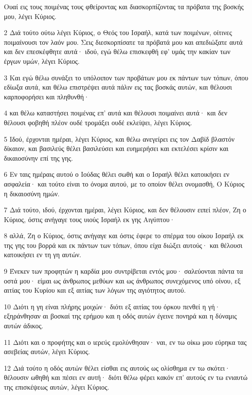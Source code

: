 \par Ουαί εις τους ποιμένας τους φθείροντας και διασκορπίζοντας τα πρόβατα της βοσκής μου, λέγει Κύριος.
\par 2 Διά τούτο ούτω λέγει Κύριος, ο Θεός του Ισραήλ, κατά των ποιμένων, οίτινες ποιμαίνουσι τον λαόν μου. Σεις διεσκορπίσατε τα πρόβατά μου και απεδιώξατε αυτά και δεν επεσκέφθητε αυτά· ιδού, εγώ θέλω επισκεφθή εφ' υμάς την κακίαν των έργων υμών, λέγει Κύριος.
\par 3 Και εγώ θέλω συνάξει το υπόλοιπον των προβάτων μου εκ πάντων των τόπων, όπου εδίωξα αυτά, και θέλω επιστρέψει αυτά πάλιν εις τας βοσκάς αυτών, και θέλουσι καρποφορήσει και πληθυνθή·
\par 4 και θέλω καταστήσει ποιμένας επ' αυτά και θέλουσι ποιμαίνει αυτά· και δεν θέλουσι φοβηθή πλέον ουδέ τρομάξει ουδέ εκλείψει, λέγει Κύριος.
\par 5 Ιδού, έρχονται ημέραι, λέγει Κύριος, και θέλω ανεγείρει εις τον Δαβίδ βλαστόν δίκαιον, και βασιλεύς θέλει βασιλεύσει και ευημερήσει και εκτελέσει κρίσιν και δικαιοσύνην επί της γης.
\par 6 Εν ταις ημέραις αυτού ο Ιούδας θέλει σωθή και ο Ισραήλ θέλει κατοικήσει εν ασφαλεία· και τούτο είναι το όνομα αυτού, με το οποίον θέλει ονομασθή, Ο Κύριος η δικαιοσύνη ημών.
\par 7 Διά τούτο, ιδού, έρχονται ημέραι, λέγει Κύριος, και δεν θέλουσιν ειπεί πλέον, Ζη ο Κύριος, όστις ανήγαγε τους υιούς Ισραήλ εκ γης Αιγύπτου·
\par 8 αλλά, Ζη ο Κύριος, όστις ανήγαγε και όστις έφερε το σπέρμα του οίκου Ισραήλ εκ της γης του βορρά και εκ πάντων των τόπων, όπου είχα διώξει αυτούς· και θέλουσι κατοικήσει εν τη γη αυτών.
\par 9 Ένεκεν των προφητών η καρδία μου συντρίβεται εντός μου· σαλεύονται πάντα τα οστά μου· είμαι ως άνθρωπος μεθύων και ως άνθρωπος συνεχόμενος υπό οίνου, εξ αιτίας του Κυρίου και εξ αιτίας των λόγων της αγιότητος αυτού.
\par 10 Διότι η γη είναι πλήρης μοιχών· διότι εξ αιτίας του όρκου πενθεί η γή· εξηράνθησαν αι βοσκαί της ερήμου και η οδός αυτών έγεινε πονηρά και η δύναμις αυτών άδικος.
\par 11 Διότι και ο προφήτης και ο ιερεύς εμολύνθησαν· ναι, εν τω οίκω μου εύρηκα τας ασεβείας αυτών, λέγει Κύριος.
\par 12 Διά τούτο η οδός αυτών θέλει είσθαι εις αυτούς ως ολίσθημα εν τω σκότει· θέλουσιν ωθηθή και πέσει εν αυτή· διότι θέλω φέρει κακόν επ' αυτούς εν τω ενιαυτώ της επισκέψεως αυτών, λέγει Κύριος.
